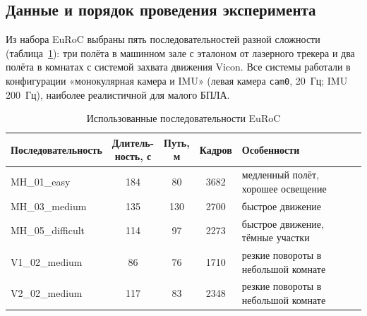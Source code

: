     \subsection{Данные и порядок проведения эксперимента}

    Из набора EuRoC выбраны пять последовательностей разной сложности (таблица~\ref{table:euroc_seq}): три полёта в машинном зале с эталоном от лазерного трекера и два полёта в комнатах с системой захвата движения Vicon.
    Все системы работали в конфигурации «монокулярная камера и IMU» (левая камера \texttt{cam0}, 20~Гц; IMU 200~Гц), наиболее реалистичной для малого БПЛА.

    \begin{table}[H]
        \caption{Использованные последовательности EuRoC}
        \label{table:euroc_seq}
        \small
        \centering
        \renewcommand{\arraystretch}{1.2}
        \begin{tabularx}{\textwidth}{|l|c|c|c|X|}
            \hline
            \textbf{Последовательность} & \makecell{\textbf{Длитель-}\\\textbf{ность, с}} & \makecell{\textbf{Путь,}\\\textbf{м}} & \textbf{Кадров} & \textbf{Особенности} \\
            \hline
            MH\_01\_easy & 184 & 80 & 3682 & медленный полёт, хорошее освещение \\
            MH\_03\_medium & 135 & 130 & 2700 & быстрое движение \\
            MH\_05\_difficult & 114 & 97 & 2273 & быстрое движение, тёмные участки \\
            V1\_02\_medium & 86 & 76 & 1710 & резкие повороты в небольшой комнате \\
            V2\_02\_medium & 117 & 83 & 2348 & резкие повороты в небольшой комнате \\
            \hline
        \end{tabularx}
    \end{table}

